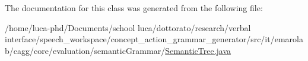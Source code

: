 The documentation for this class was generated from the following file\-:\begin{DoxyCompactItemize}
\item 
/home/luca-\/phd/\-Documents/school luca/dottorato/research/verbal interface/speech\-\_\-workspace/concept\-\_\-action\-\_\-grammar\-\_\-generator/src/it/emarolab/cagg/core/evaluation/semantic\-Grammar/\hyperlink{SemanticTree_8java}{Semantic\-Tree.\-java}\end{DoxyCompactItemize}
